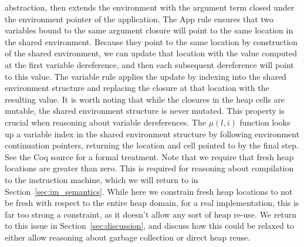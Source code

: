 abstraction, then extends the environment with the argument term closed under the
environment pointer of the application. The App rule ensures that two
variables bound to the same argument closure will point to the same location in
the shared environment. Because they point to the same location by construction
of the shared environment, we can update that location with the value computed
at the first variable dereference, and then each subsequent dereference will
point to this value. The variable rule applies the update by indexing into the
shared environment structure and replacing the closure at that location with the
resulting value. It is worth noting that while the closures in the heap cells
are mutable, the shared environment structure is never mutated. This property is
crucial when reasoning about variable dereferences. The $\mu\left(l, i\right)$
function looks up a variable index in the shared environment structure by
following environment continuation pointers, returning the location and cell
pointed to by the final step. See the Coq source
for a formal treatment. Note that we require that fresh heap locations are
greater than zero. This is required for reasoning about compilation to the
instruction machine, which we will return to in Section~\ref{sec:im_semantics}.
While here we constrain fresh heap locations to not be fresh with respect to the
entire heap domain, for a real implementation, this is far too strong a
constraint, as it doesn't allow any sort of heap re-use. We return to this issue
in Section~\ref{sec:discussion}, and discuss how this could be relaxed to either
allow reasoning about garbage collection or direct heap reuse.

